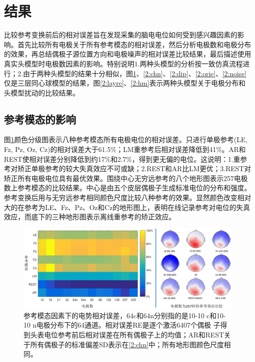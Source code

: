 \section{结果}
比较参考变换前后的相对误差旨在发现采集的脑电电位如何受到感兴趣因素的影响。首先比较所有电极关于所有参考模态的相对误差，然后分析电极数和电极分布的效果，再总结偶极子源位置方向和电极噪声的相对误差比较结果，最后描述使用真实头模型时电极数因素的影响。特别说明1.两种头模型的分析按一致仿真流程进行；2.由于两种头模型的结果十分相似，图\ref{2:re}、\ref{2:chn}、\ref{2:dip}、\ref{2:orie}、\ref{2:noise}仅是三层同心球模型的结果，图\ref{2:layre}、\ref{2:hm}表示两种头模型关于电极分布和头模型扰动的比较结果。

\subsection{参考模态的影响}
图\ref{2:re}颜色分级图表示八种参考模态所有电极电位的相对误差。只进行单极参考(LE, Fz, Pz, Oz, Cz)的相对误差大于61.5\%；LM重参考后相对误差降低到41\%。AR和REST使相对误差分别降低到约17\%和2.7\%，得到更无偏的电位。这说明：1.重参考对矫正单极参考的较大失真效应不可或缺；2.REST和AR比LM更优；3.REST对矫正所有电极电位具有最优效果。围绕中心无穷远参考的八个地形图表示257电极数上参考模态的比较结果。中心是由五个皮层偶极子生成标准电位的分布和强度。参考变换后用与无穷远参考相同颜色尺度比较八种参考的效果。显然颜色改变相对大的在参考为LE、Fz、Pz、Oz和Cz的地形图上，表明在线记录参考对电位的失真效应，而底下的三种地形图表示离线重参考的矫正效应。
\begin{figure}[h!]
	\centering
	\includegraphics[width=15cm]{pic/JNE/figure3.png}
	\caption{参考模态因素下的电势相对误差，64c和64n分别指的是10-10 c和10-10 n电极分布下的64通道。相对误差RE是逐个激活6407个偶极
	子得到头表电位参考前后相对误差在所有偶极子上的均值；AR和REST关于所有偶极子的标准偏差SD表示在\ref{2:chn}中；所有地形图颜色尺度相同。}
	\label{2:re}
\end{figure}

